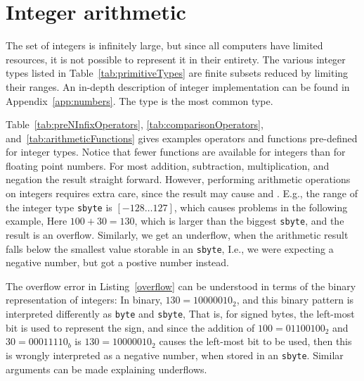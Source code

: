 \section{Integer arithmetic}
The set of integers is infinitely large, but since all computers have limited resources, it is not possible to represent it in their entirety. The various integer types listed in Table~\ref{tab:primitiveTypes} are finite subsets reduced by limiting their ranges. 
An in-depth description of integer implementation can be found in Appendix~\ref{app:numbers}. The type  is the most common type. 

Table~\ref{tab:preNInfixOperators}, \ref{tab:comparisonOperators}, and~\ref{tab:arithmeticFunctions} gives examples operators and functions pre-defined for integer types. Notice that fewer functions are available for integers than for floating point numbers. For most addition, subtraction, multiplication, and negation the result straight forward. However, performing arithmetic operations on integers requires extra care, since the result may cause  and . E.g., the range of the integer type \lstinline|sbyte| is $[-128\ldots 127]$, which causes problems in the following example,
%
%
Here $100+30=130$, which is larger than the biggest \lstinline|sbyte|, and the result is an overflow. Similarly, we get an underflow, when the arithmetic result falls below the smallest value storable in an \lstinline|sbyte|,
%
%
I.e., we were expecting a negative number, but got a postive number instead.

The overflow error in Listing~\ref{overflow} can be understood in terms of the binary representation of integers: In binary, $130=10000010_2$, and this binary pattern is interpreted differently as \lstinline{byte} and \lstinline{sbyte},
%
%
That is, for signed bytes, the left-most bit is used to represent the sign, and since the addition of $100=01100100_2$ and $30=00011110_b$ is $130=10000010_2$ causes the left-most bit to be used, then this is wrongly interpreted as a negative number, when stored in an \lstinline{sbyte}. Similar arguments can be made explaining underflows.

